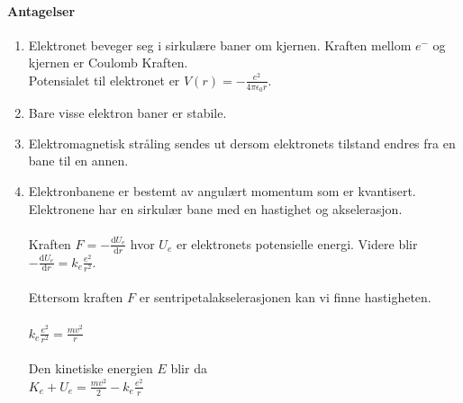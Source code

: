 \paragraph{Antagelser}
\begin{enumerate}
    \item Elektronet beveger seg i sirkulære baner om kjernen. Kraften mellom $e^{-}$ og kjernen er Coulomb Kraften.\\ Potensialet til elektronet er $\displaystyle  V(r) = -\frac{e^{2}}{4\pi\epsilon_{0}r}$.
    \item Bare visse elektron baner er stabile. 
    \item Elektromagnetisk stråling sendes ut dersom elektronets tilstand endres fra en bane til en annen. 
    \item Elektronbanene er bestemt av angulært momentum som er kvantisert. Elektronene har en sirkulær bane med en hastighet og akselerasjon.\\\\ 
    Kraften $\displaystyle  F = - \frac{\mathrm{d}U_e}{\mathrm{d}r}$ hvor $U_e$ er elektronets potensielle energi. Videre blir \\ $\displaystyle -\frac{\mathrm{d}U_e}{\mathrm{d}r} = k_e \frac{e^{2}}{r^{2}} $. \\\\ Ettersom kraften $F$ er sentripetalakselerasjonen kan vi finne hastigheten. \\\\ 
    $\displaystyle k_e \frac{e^{2}}{r^{2}} = \frac{mv^{2}}{r}$\\\\
    Den kinetiske energien $E $ blir da \\ 
    $\displaystyle K_e + U_e = \frac{mv^{2}}{2} - k_e \frac{e^{2}}{r}$

    
\end{enumerate}
